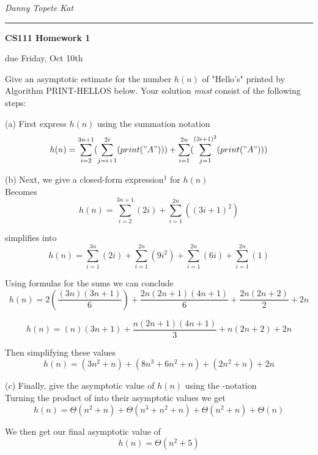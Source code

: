 \documentclass[11pt]{article}
\newcommand{\student}[1]{{\noindent\Large\em {#1} \hfill}\vskip 0.1in}
\newcommand{\assignment}[1]{\centerline{\large\bf CS111 Homework {#1}}}
\newcommand{\duedate}[1]{{\centerline{due {#1}}}}
\newcounter{prnum}
\newenvironment{problem}{{\vskip 0.2in\noindent\bf Problem
       \addtocounter{prnum}{1} \arabic{prnum}.}}{\vskip 0.1in}
\begin{document}
\student{Danny Topete} %
\student{Kat} %
\vskip 0.1in\noindent\hrule\vskip 0.2in
\assignment{1}                           %
\duedate{Friday, Oct 10th}              %


\begin{problem}
Give an asymptotic estimate for the number $h(n)$ of "Hello's" printed by Algorithm PRINT-HELLOS below. 
Your solution \textit{must} consist of the following steps:

(a) First express $h(n)$
using the summation notation \Sigma \\

\begin{equation*}
  h(n) = \sum_{i=2}^{3n+1} (\sum_{j=i+1}^{2i}(print("A"))) 
  + \sum_{i=1}^{2n}(\sum_{j=1}^{(3i+1)^2}(print("A")))
\end{equation*}

(b) Next, we give a closed-form expression$^1$ for $h(n)$ \\

Becomes
\begin{equation}
  h(n) = \sum_{i=2}^{3n+1}(2i)  
  + \sum_{i=1}^{2n}((3i+1)^2)
\end{equation}

simplifies into
\begin{equation}
  h(n) = \sum_{i=1}^{3n}(2i)  
  + \sum_{i=1}^{2n}(9i^2)
  + \sum_{i=1}^{2n}(6i)
  + \sum_{i=1}^{2n}(1)
\end{equation}

Using formulas for the sums we can conclude
\begin{equation}
  h(n) = 2(\frac{(3n)(3n+1)}{6})
  + \frac{2n(2n+1)(4n+1)}{6} 
  + \frac{2n(2n+2)}{2} 
  + 2n 
\end{equation}

\begin{equation}
  h(n) = (n)(3n+1)
  + \frac{n(2n+1)(4n+1)}{3} 
  + n(2n+2) 
  + 2n 
\end{equation}

\smallskip
Then simplifying these values
\begin{equation}
  h(n) = (3n^2 + n)
  + (8n^3 + 6n^2 + n)
  + (2n^2 + n)
  + 2n 
\end{equation}

(c) Finally, give the asymptotic value of $h(n)$ using the \Theta-notation \\

Turning the product of into their asymptotic values we get
\begin{equation}
  h(n) = \Theta(n^2 + n)
  + \Theta(n^3 + n^2 + n)
  + \Theta(n^2 + n)
  + \Theta(n) 
\end{equation}

We then get our final asymptotic value of
\begin{equation}
h(n) = \Theta(n^2 + 5)
\end{equation}

\end{problem}
\end{document}
